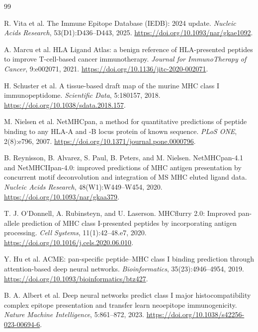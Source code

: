 \begingroup
\small
\begin{thebibliography}{99}

R. Vita et al.
\newblock The Immune Epitope Database (IEDB): 2024 update.
\newblock \emph{Nucleic Acids Research}, 53(D1):D436--D443, 2025.
\newblock \url{https://doi.org/10.1093/nar/gkae1092}.

A. Marcu et al.
\newblock HLA Ligand Atlas: a benign reference of HLA-presented peptides to improve T-cell-based cancer immunotherapy.
\newblock \emph{Journal for ImmunoTherapy of Cancer}, 9:e002071, 2021.
\newblock \url{https://doi.org/10.1136/jitc-2020-002071}.

H. Schuster et al.
\newblock A tissue-based draft map of the murine MHC class I immunopeptidome.
\newblock \emph{Scientific Data}, 5:180157, 2018.
\newblock \url{https://doi.org/10.1038/sdata.2018.157}.

M. Nielsen et al.
\newblock NetMHCpan, a method for quantitative predictions of peptide binding to any HLA-A and -B locus protein of known sequence.
\newblock \emph{PLoS ONE}, 2(8):e796, 2007.
\newblock \url{https://doi.org/10.1371/journal.pone.0000796}.

B. Reynisson, B. Alvarez, S. Paul, B. Peters, and M. Nielsen.
\newblock NetMHCpan-4.1 and NetMHCIIpan-4.0: improved predictions of MHC antigen presentation by concurrent motif deconvolution and integration of MS MHC eluted ligand data.
\newblock \emph{Nucleic Acids Research}, 48(W1):W449--W454, 2020.
\newblock \url{https://doi.org/10.1093/nar/gkaa379}.

T. J. O'Donnell, A. Rubinsteyn, and U. Laserson.
\newblock MHCflurry 2.0: Improved pan-allele prediction of MHC class I-presented peptides by incorporating antigen processing.
\newblock \emph{Cell Systems}, 11(1):42--48.e7, 2020.
\newblock \url{https://doi.org/10.1016/j.cels.2020.06.010}.

Y. Hu et al.
\newblock ACME: pan-specific peptide--MHC class I binding prediction through attention-based deep neural networks.
\newblock \emph{Bioinformatics}, 35(23):4946--4954, 2019.
\newblock \url{https://doi.org/10.1093/bioinformatics/btz427}.

B. A. Albert et al.
\newblock Deep neural networks predict class I major histocompatibility complex epitope presentation and transfer learn neoepitope immunogenicity.
\newblock \emph{Nature Machine Intelligence}, 5:861--872, 2023.
\newblock \url{https://doi.org/10.1038/s42256-023-00694-6}.


\end{thebibliography}
